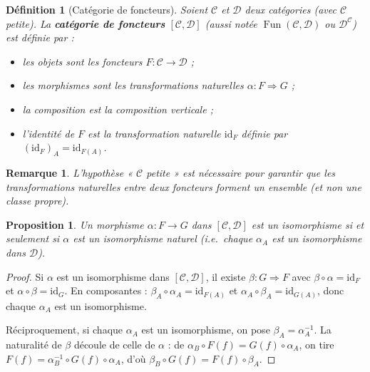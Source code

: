 \documentclass[a4paper,12pt]{book}
\DeclareMathOperator{\Fun}{Fun}
\newcommand{\id}{\mathrm{id}}
\newtheorem{proposition}[theoreme]{Proposition}
\newtheorem{definition}[theoreme]{Définition}
\newtheorem*{remarque}{Remarque}
\begin{document}
\begin{definition}[Catégorie de foncteurs]\label{def:cat-foncteurs}
Soient $\mathcal{C}$ et $\mathcal{D}$ deux catégories (avec $\mathcal{C}$ petite). La \textbf{catégorie de foncteurs} $[\mathcal{C}, \mathcal{D}]$ (aussi notée $\Fun(\mathcal{C}, \mathcal{D})$ ou $\mathcal{D}^\mathcal{C}$) est définie par :
\begin{itemize}
  \item les objets sont les foncteurs $F : \mathcal{C} \to \mathcal{D}$ ;
  \item les morphismes sont les transformations naturelles $\alpha : F \Rightarrow G$ ;
  \item la composition est la composition verticale ;
  \item l'identité de $F$ est la transformation naturelle $\id_F$ définie par $(\id_F)_A = \id_{F(A)}$.
\end{itemize}
\end{definition}

\begin{remarque}
L'hypothèse « $\mathcal{C}$ petite » est nécessaire pour garantir que les transformations naturelles entre deux foncteurs forment un ensemble (et non une classe propre).
\end{remarque}

\begin{proposition}\label{prop:iso-cat-foncteurs}
Un morphisme $\alpha : F \to G$ dans $[\mathcal{C}, \mathcal{D}]$ est un isomorphisme si et seulement si $\alpha$ est un isomorphisme naturel (i.e.\ chaque $\alpha_A$ est un isomorphisme dans $\mathcal{D}$).
\end{proposition}

\begin{proof}
Si $\alpha$ est un isomorphisme dans $[\mathcal{C}, \mathcal{D}]$, il existe $\beta : G \Rightarrow F$ avec $\beta \circ \alpha = \id_F$ et $\alpha \circ \beta = \id_G$. En composantes : $\beta_A \circ \alpha_A = \id_{F(A)}$ et $\alpha_A \circ \beta_A = \id_{G(A)}$, donc chaque $\alpha_A$ est un isomorphisme.

Réciproquement, si chaque $\alpha_A$ est un isomorphisme, on pose $\beta_A = \alpha_A^{-1}$. La naturalité de $\beta$ découle de celle de $\alpha$ : de $\alpha_B \circ F(f) = G(f) \circ \alpha_A$, on tire $F(f) = \alpha_B^{-1} \circ G(f) \circ \alpha_A$, d'où $\beta_B \circ G(f) = F(f) \circ \beta_A$.
\end{proof}
\end{document}

